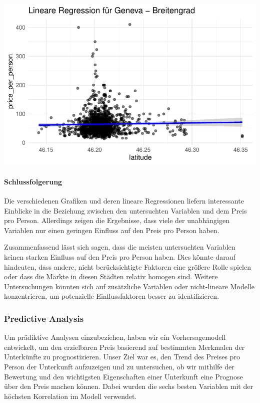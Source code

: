 \documentclass[
  journal,
]{IEEEtran}%
\let\oldparagraph\paragraph
\renewcommand{\paragraph}[1]{\oldparagraph{#1}\mbox{}}
\begin{document}
\includegraphics{main_files/figure-pdf/unnamed-chunk-16-8.pdf}

\hypertarget{schlussfolgerung}{%
\paragraph{Schlussfolgerung}\label{schlussfolgerung}}

Die verschiedenen Grafiken und deren lineare Regressionen liefern
interessante Einblicke in die Beziehung zwischen den untersuchten
Variablen und dem Preis pro Person. Allerdings zeigen die Ergebnisse,
dass viele der unabhängigen Variablen nur einen geringen Einfluss auf
den Preis pro Person haben.

Zusammenfassend lässt sich sagen, dass die meisten untersuchten
Variablen keinen starken Einfluss auf den Preis pro Person haben. Dies
könnte darauf hindeuten, dass andere, nicht berücksichtigte Faktoren
eine größere Rolle spielen oder dass die Märkte in diesen Städten
relativ homogen sind. Weitere Untersuchungen könnten sich auf
zusätzliche Variablen oder nicht-lineare Modelle konzentrieren, um
potenzielle Einflussfaktoren besser zu identifizieren.

\hypertarget{predictive-analysis-1}{%
\subsubsection{Predictive Analysis}\label{predictive-analysis-1}}

Um prädiktive Analysen einzubeziehen, haben wir ein Vorhersagemodell
entwickelt, um den erzielbaren Preis basierend auf bestimmten Merkmalen
der Unterkünfte zu prognostizieren. Unser Ziel war es, den Trend des
Preises pro Person der Unterkunft aufzuzeigen und zu untersuchen, ob wir
mithilfe der Bewertung und den wichtigsten Eigenschaften einer
Unterkunft eine Prognose über den Preis machen können. Dabei wurden die
sechs besten Variablen mit der höchsten Korrelation im Modell verwendet.
\end{document}
